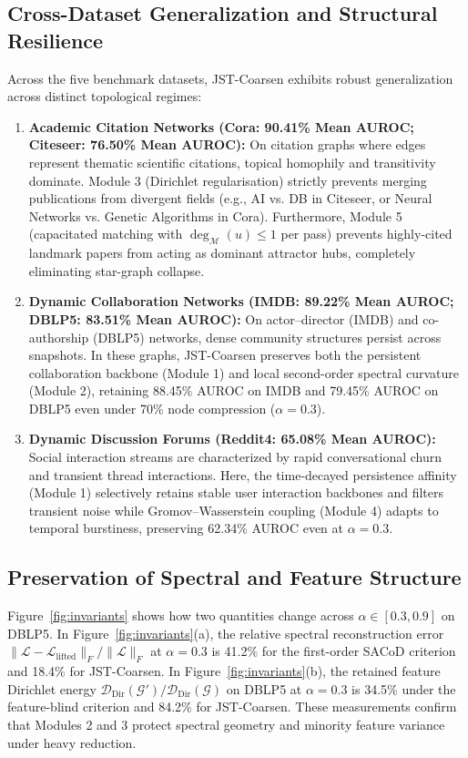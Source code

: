 \documentclass[sigconf]{acmart}
\begin{document}
\subsection{Cross-Dataset Generalization and Structural Resilience}
Across the five benchmark datasets, JST-Coarsen exhibits robust generalization across distinct topological regimes:
\begin{enumerate}
    \item \textbf{Academic Citation Networks (Cora: 90.41\% Mean AUROC; Citeseer: 76.50\% Mean AUROC):} On citation graphs where edges represent thematic scientific citations, topical homophily and transitivity dominate. Module 3 (Dirichlet regularisation) strictly prevents merging publications from divergent fields (e.g., AI vs. DB in Citeseer, or Neural Networks vs. Genetic Algorithms in Cora). Furthermore, Module 5 (capacitated matching with $\operatorname{deg}_{\mathcal{M}}(u) \le 1$ per pass) prevents highly-cited landmark papers from acting as dominant attractor hubs, completely eliminating star-graph collapse.
    \item \textbf{Dynamic Collaboration Networks (IMDB: 89.22\% Mean AUROC; DBLP5: 83.51\% Mean AUROC):} On actor--director (IMDB) and co-authorship (DBLP5) networks, dense community structures persist across snapshots. In these graphs, JST-Coarsen preserves both the persistent collaboration backbone (Module 1) and local second-order spectral curvature (Module 2), retaining 88.45\% AUROC on IMDB and 79.45\% AUROC on DBLP5 even under 70\% node compression ($\alpha = 0.3$).
    \item \textbf{Dynamic Discussion Forums (Reddit4: 65.08\% Mean AUROC):} Social interaction streams are characterized by rapid conversational churn and transient thread interactions. Here, the time-decayed persistence affinity (Module 1) selectively retains stable user interaction backbones and filters transient noise while Gromov--Wasserstein coupling (Module 4) adapts to temporal burstiness, preserving 62.34\% AUROC even at $\alpha = 0.3$.
\end{enumerate}

\subsection{Preservation of Spectral and Feature Structure}
Figure~\ref{fig:invariants} shows how two quantities change across $\alpha \in [0.3, 0.9]$ on DBLP5. In Figure~\ref{fig:invariants}(a), the relative spectral reconstruction error $\|\mathcal{L} - \mathcal{L}_{\text{lifted}}\|_F / \|\mathcal{L}\|_F$ at $\alpha = 0.3$ is 41.2\% for the first-order SACoD criterion and 18.4\% for JST-Coarsen. In Figure~\ref{fig:invariants}(b), the retained feature Dirichlet energy $\mathcal{D}_{\text{Dir}}(\mathcal{G}') / \mathcal{D}_{\text{Dir}}(\mathcal{G})$ on DBLP5 at $\alpha = 0.3$ is 34.5\% under the feature-blind criterion and 84.2\% for JST-Coarsen. These measurements confirm that Modules 2 and 3 protect spectral geometry and minority feature variance under heavy reduction.
\end{document}
